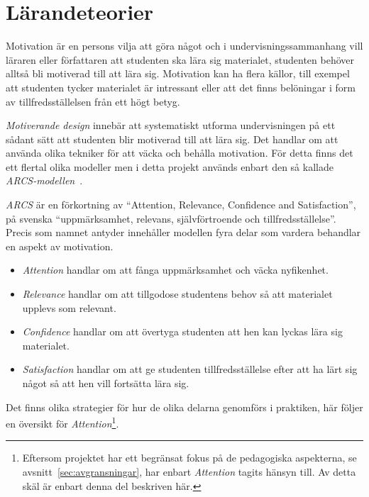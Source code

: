 \section{Lärandeteorier}\label{sec:arcs}

Motivation är en persons vilja att göra något och i undervisningssammanhang vill
läraren eller författaren att studenten ska lära sig materialet, studenten behöver alltså bli
motiverad till att lära sig. Motivation kan ha flera källor, till exempel
att studenten tycker materialet är intressant eller att det finns belöningar i
form av tillfredsställelsen från ett högt betyg.

\textit{Motiverande design} innebär att systematiskt utforma undervisningen på
ett sådant sätt att studenten blir motiverad till att lära sig. Det handlar om
att använda olika tekniker för att väcka och behålla motivation. För detta finns
det ett flertal olika modeller men i detta projekt används enbart den så
kallade \textit{ARCS-modellen}~\cite{arcs_book}.

\textit{ARCS} är en förkortning av ``Attention, Relevance, Confidence and
Satisfaction'', på svenska ``uppmärksamhet, relevans, självförtroende och
tillfredsställelse''. Precis som namnet antyder innehåller modellen fyra delar
som vardera behandlar en aspekt av motivation.
\begin{itemize}
  \item \textit{Attention} handlar om att fånga uppmärksamhet och väcka
    nyfikenhet.
  \item \textit{Relevance} handlar om att tillgodose studentens behov så
    att materialet upplevs som relevant.
  \item \textit{Confidence} handlar om att övertyga studenten att hen kan lyckas
    lära sig materialet.
  \item \textit{Satisfaction} handlar om att ge studenten
    tillfredsställelse efter att ha lärt sig något så att hen vill fortsätta
    lära sig.
\end{itemize}
Det finns olika strategier för hur de olika delarna genomförs i praktiken,
här följer en översikt för \textit{Attention}\footnote{Eftersom projektet har
ett begränsat fokus på de pedagogiska aspekterna, se
avsnitt~\ref{sec:avgransningar}, har enbart \textit{Attention} tagits hänsyn
till. Av detta skäl är enbart denna del beskriven här.}.

